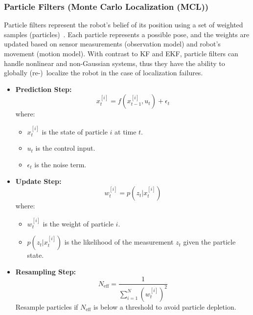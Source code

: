     
\newpage
\subsubsection{Particle Filters (Monte Carlo Localization (MCL))}
Particle filters represent the robot's belief of its position using a set of weighted samples (particles)~\cite{thrun2005probabilistic}.
Each particle represents a possible pose, and the weights are updated based on sensor measurements (observation model) and robot's
movement (motion model). With contrast to KF and EKF, particle filters can handle nonlinear and non-Gaussian systems, thus they have
the ability to globally (re-)~localize the robot in the case of localization failures. 
\vspace{-0.3em}
\vspace{-0.5em}
\begin{itemize}
    \item \textbf{Prediction Step:}
    \begin{equation}
        x_t^{[i]} = f(x_{t-1}^{[i]}, u_t) + \epsilon_t
    \end{equation}
    \vspace{-0.5em}
    where:
    \begin{itemize}
        \item $x_t^{[i]}$ is the state of particle $i$ at time $t$.
        \item $u_t$ is the control input.
        \item $\epsilon_t$ is the noise term.
    \end{itemize}
    \vspace{-0.7em}
    \item \textbf{Update Step:}
    \begin{equation}
        w_t^{[i]} = p(z_t | x_t^{[i]})
    \end{equation}
    \vspace{-0.5em}
    where:
    \begin{itemize}
        \item $w_t^{[i]}$ is the weight of particle $i$.
        \item $p(z_t | x_t^{[i]})$ is the likelihood of the measurement $z_t$ given the particle state.
    \end{itemize}

    \item \textbf{Resampling Step:}
    \begin{equation}
        N_{\text{eff}} = \frac{1}{\sum_{i=1}^{N} {(w_t^{[i]})}^2}
    \end{equation}
    Resample particles if $N_{\text{eff}}$ is below a threshold to avoid particle depletion.
\end{itemize}

